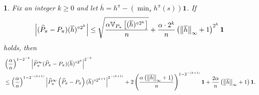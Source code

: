 \documentclass{article}
\theoremstyle{plain}
\theoremstyle{plain}
\newtheorem{lem}[thm]{\protect\lemmaname}
\theoremstyle{remark}
\theoremstyle{plain}
\theoremstyle{plain}
\providecommand{\lemmaname}{Lemma}
\newcommand{\Var}{\mathbb{V}}
\newcommand{\Phat}{\widehat{P}}
\newcommand{\one}{\mathbf{1}}
\newcommand{\hc}{\overline{h}}
\begin{document}
\begin{lem}
\label{lem:recursive_variance_param_bound}
Fix an integer $k \geq 0$ and let $\hc = h^\pi - \left(\min_s h^\pi(s)\right)\one $. If
    \begin{align}
        \left|(\Phat_\pi - P_\pi) (\hc)^{\circ 2^k} \right| \leq \sqrt{\frac{\alpha \Var_{P_\pi}\left[(\hc)^{\circ 2^k} \right] }{n}} + \frac{\alpha \cdot 2^k  }{n} \left(\infnorm{\hc} + 1 \right)^{2^k} \one \label{eq:bernstein_condition_shifted}
    \end{align}
    holds, then
    \begin{align*}
        &\left(\frac{\alpha}{n}\right)^{1-2^{-k}}\left|\Phat_\pi^\infty (\Phat_\pi - P_\pi) (\hc)^{\circ 2^k} \right|^{2^{-k}} \\
        &\leq \left(\frac{\alpha}{n}\right)^{1-2^{-(k+1)}}  \left|  \Phat_\pi^\infty \left(\Phat_\pi - P_\pi \right) (\hc)^{\circ 2^{k+1} } \right|^{2^{-(k+1)}} + 2 \left(\frac{\alpha \left(\infnorm{\hc} + 1\right)}{n} \right)^{1 - 2^{-(k+1)}}\one+ \frac{2\alpha   }{n}\left(\infnorm{\hc} + 1 \right) \one.
    \end{align*}
\end{lem}
\end{document}
